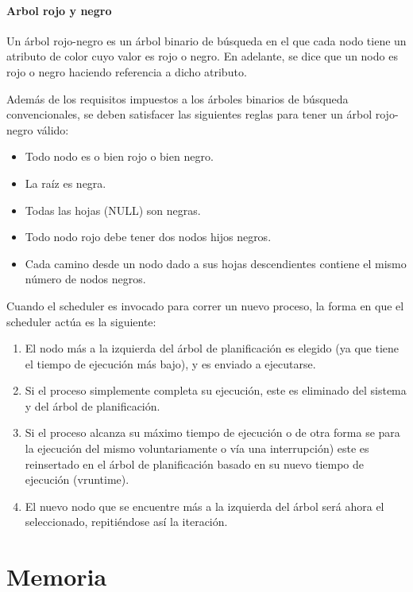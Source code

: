 \documentclass{article}
\begin{document}
\paragraph{Arbol rojo y negro}\label{arbol-rojo-y-negro}

Un árbol rojo-negro es un árbol binario de búsqueda en el que cada nodo
tiene un atributo de color cuyo valor es rojo o negro. En adelante, se
dice que un nodo es rojo o negro haciendo referencia a dicho atributo.

Además de los requisitos impuestos a los árboles binarios de búsqueda
convencionales, se deben satisfacer las siguientes reglas para tener un
árbol rojo-negro válido:

\begin{itemize}
\item
  Todo nodo es o bien rojo o bien negro.
\item
  La raíz es negra.
\item
  Todas las hojas (NULL) son negras.
\item
  Todo nodo rojo debe tener dos nodos hijos negros.
\item
  Cada camino desde un nodo dado a sus hojas descendientes contiene el
  mismo número de nodos negros.
\end{itemize}

Cuando el scheduler es invocado para correr un nuevo proceso, la forma
en que el scheduler actúa es la siguiente:

\begin{enumerate}
\def\labelenumi{\arabic{enumi}.}
\item
  El nodo más a la izquierda del árbol de planificación es elegido (ya
  que tiene el tiempo de ejecución más bajo), y es enviado a ejecutarse.
\item
  Si el proceso simplemente completa su ejecución, este es eliminado del
  sistema y del árbol de planificación.
\item
  Si el proceso alcanza su máximo tiempo de ejecución o de otra forma se
  para la ejecución del mismo voluntariamente o vía una interrupción)
  este es reinsertado en el árbol de planificación basado en su nuevo
  tiempo de ejecución (vruntime).
\item
  El nuevo nodo que se encuentre más a la izquierda del árbol será ahora
  el seleccionado, repitiéndose así la iteración.
\end{enumerate}

\section{Memoria}\label{memoria}
\end{document}
